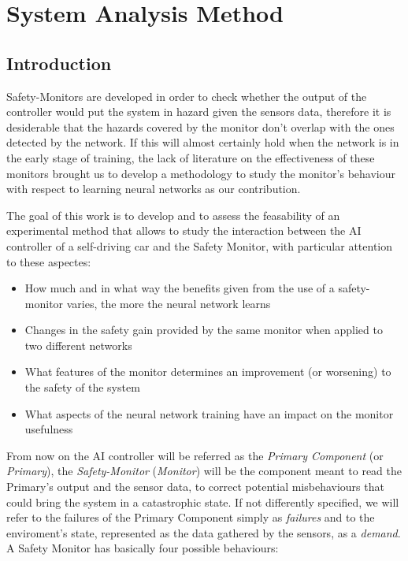 \chapter{System Analysis Method}

\section{Introduction}

Safety-Monitors are developed in order to check whether the output of the controller would put the system in hazard given the sensors data, therefore it is desiderable that the hazards covered by the monitor don't overlap with the ones detected by the network. If this will almost certainly hold when the network is in the early stage of training, the lack of literature on the effectiveness of these monitors brought us to develop a methodology to study the monitor's behaviour with respect to learning neural networks as our contribution.\newline

The goal of this work is to develop and to assess the feasability of an experimental method that allows to study the interaction between the AI controller of a self-driving car and the Safety Monitor, with particular attention to these aspectes:

\begin{itemize}
	\item How much and in what way the benefits given from the use of a safety-monitor varies, the more the neural network learns
	\item Changes in the safety gain provided by the same monitor when applied to two different networks
	\item What features of the monitor determines an improvement (or worsening) to the safety of the system
	\item What aspects of the neural network training have an impact on the monitor usefulness
\end{itemize}

From now on the AI controller will be referred as the \textsl{Primary Component} (or \textsl{Primary}), the \textsl{Safety-Monitor} (\textsl{Monitor}) will be the component meant to read the Primary's output and the sensor data, to correct potential misbehaviours that could bring the system in a catastrophic state. If not differently specified, we will refer to the failures of the Primary Component simply as \textsl{failures} and to the enviroment's state, represented as the data gathered by the sensors, as a \textsl{demand}.\newline
A Safety Monitor has basically four possible behaviours:

